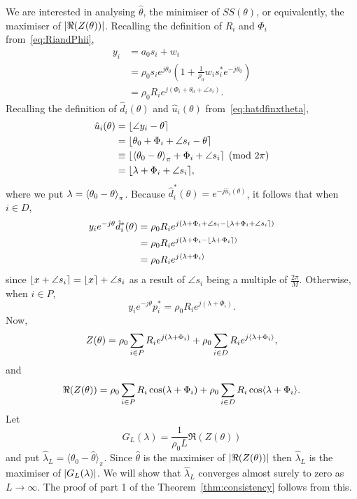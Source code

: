 \documentclass[journal]{IEEEtran}
\begin{document}
We are interested in analysing $\hat{\theta}$, the minimiser of $SS(\theta)$, or equivalently, the maximiser of ${\left\vert \Re(Z(\theta)) \right\vert}$.  Recalling the definition of $R_i$ and $\Phi_i$ from~\eqref{eq:RiandPhii},
\begin{align*}
y_i &= a_0 s_i + w_i \\
&= \rho_0 s_i e^{j \theta_0}\left( 1 + \frac{1}{\rho_0} w_i s_i^* e^{-j \theta_0} \right) \\
&= \rho_0 R_i e^{j ( \Phi_i + \theta_0 + \angle{s_i}) }.
\end{align*}
Recalling the definition of $\hat{d}_i(\theta)$ and $\hat{u}_i(\theta)$ from~\eqref{eq:hatdfinxtheta},
\begin{align*}
\hat{u}_i(\theta) &= {\left\lfloor \angle{y_i} - \theta \right\rceil} \\
&= {\left\lfloor \theta_0 + \Phi_i + \angle{s_i} - \theta \right\rceil} \\
&\equiv {\left\lfloor  \left\langle \theta_0 - \theta \right\rangle_{\pi} + \Phi_i + \angle{s_i} \right\rceil} \pmod{2\pi} \\
&= {\left\lfloor  \lambda + \Phi_i + \angle{s_i}  \right\rceil},
\end{align*}
where we put $\lambda = \left\langle \theta_0 - \theta \right\rangle_\pi$.  Because $\hat{d}_i^*(\theta) = e^{-j\hat{u}_i(\theta)}$, it follows that when $i \in D$,
\begin{align*}
 y_i e^{-j\theta} \hat{d}_i^*(\theta) &= \rho_0 R_i e^{j(\lambda + \Phi_i + \angle{s_i} - {\left\lfloor \lambda + \Phi_i + \angle{s_i} \right\rceil})} \\
&= \rho_0 R_i e^{j(\lambda + \Phi_i - {\left\lfloor \lambda + \Phi_i \right\rceil})} \\
&= \rho_0 R_i e^{j\langle \lambda + \Phi_i \rangle}
\end{align*}
since ${\left\lfloor x + \angle{s_i} \right\rceil} = {\left\lfloor x \right\rceil} + \angle{s_i}$ as a result of $\angle{s_i}$ being a multiple of $\tfrac{2\pi}{M}$.  Otherwise, when $i \in P$,  
\[
y_i e^{-j\theta} p_i^* = \rho_0 R_i e^{j(\lambda + \Phi_i)}.
\]
Now,
\[
Z(\theta) = \rho_0 \sum_{i \in P} R_i e^{j(\lambda + \Phi_i)} + \rho_0  \sum_{i \in D} R_i e^{j\langle \lambda + \Phi_i \rangle},
\]
and
\[
\Re(Z(\theta)) = \rho_0 \sum_{i \in P} R_i \cos(\lambda + \Phi_i) + \rho_0 \sum_{i \in D} R_i \cos\langle \lambda + \Phi_i \rangle.
\] 
Let 
\begin{equation}\label{eq:GLdefn}
G_L(\lambda) = \frac{1}{\rho_0 L} \Re(Z(\theta))
\end{equation}
and put $\hat{\lambda}_L = \langle\theta_0 - \hat{\theta}\rangle_\pi$.  Since $\hat{\theta}$ is the maximiser of ${\left\vert \Re(Z(\theta)) \right\vert}$ then  $\hat{\lambda}_L$ is the maximiser of ${\left\vert G_L(\lambda) \right\vert}$.  We will show that $\hat{\lambda}_L$ converges almost surely to zero as $L \rightarrow \infty$.  The proof of part 1 of the Theorem~\ref{thm:consistency} follows from this.
\end{document}
